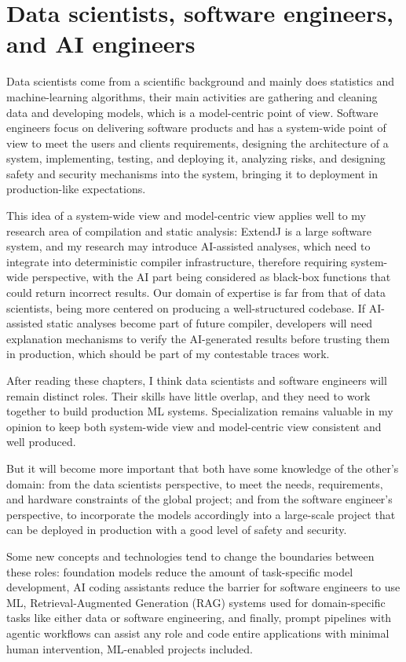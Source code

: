 \documentclass[11pt]{article}
\begin{document}
\section{Data scientists, software engineers, and AI engineers}
\label{sec:org290a74b}
Data scientists come from a scientific background and mainly does statistics
and machine-learning algorithms, their main activities are gathering and
cleaning data and developing models, which is a model-centric point of
view. Software engineers focus on delivering software products and has a
system-wide point of view to meet the users and clients requirements, designing
the architecture of a system, implementing, testing, and deploying it, analyzing
risks, and designing safety and security mechanisms into the system, bringing it
to deployment in production-like expectations.

This idea of a system-wide view and model-centric view applies well to my
research area of compilation and static analysis: ExtendJ is a large software
system, and my research may introduce AI-assisted analyses, which need to
integrate into deterministic compiler infrastructure, therefore requiring
system-wide perspective, with the AI part being considered as black-box
functions that could return incorrect results. Our domain of expertise is far
from that of data scientists, being more centered on producing a well-structured
codebase. If AI-assisted static analyses become part of future compiler,
developers will need explanation mechanisms to verify the AI-generated results
before trusting them in production, which should be part of my contestable traces
work.

After reading these chapters, I think data scientists and software engineers
will remain distinct roles. Their skills have little overlap, and they need to
work together to build production ML systems. Specialization remains valuable in
my opinion to keep both system-wide view and model-centric view consistent and
well produced.

But it will become more important that both have some knowledge of the other's
domain: from the data scientists perspective, to meet the needs, requirements,
and hardware constraints of the global project; and from the software engineer's
perspective, to incorporate the models accordingly into a large-scale project
that can be deployed in production with a good level of safety and security.

Some new concepts and technologies tend to change the boundaries between these
roles: foundation models reduce the amount of task-specific model development,
AI coding assistants reduce the barrier for software engineers to use ML,
Retrieval-Augmented Generation (RAG) systems used for domain-specific tasks like
either data or software engineering, and finally, prompt pipelines with agentic
workflows can assist any role and code entire applications with minimal human
intervention, ML-enabled projects included.
\end{document}
